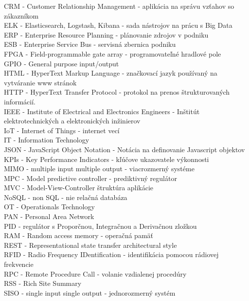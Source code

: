 CRM - Customer Relationship Management - aplikácia na správu vzťahov so zákazníkom \\
ELK - Elasticsearch, Logstash, Kibana - sada nástrojov na prácu s Big Data \\
ERP - Enterprise Resource Planning - plánovanie zdrojov v podniku \\
ESB - Enterprise Service Bus - servisná zbernica podniku \\
FPGA - Field-programmable gate array - programovateľné hradlové pole \\
GPIO - General purpose input/output \\
HTML - HyperText Markup Language - značkovací jazyk používaný na vytváranie www stránok \\
HTTP - HyperText Transfer Protocol - protokol na prenos štrukturovaných informácií. \\
IEEE - Institute of Electrical and Electronics Engineers - Inštitút elektrotechnických a elektronických inžinierov \\
IoT - Internet of Things - internet vecí \\
IT - Information Technology \\
JSON - JavaScript Object Notation - Notácia na definovanie Javascript objektov \\
KPIs - Key Performance Indicators - kľúčove ukazovatele výkonnosti \\
MIMO - multiple input multiple output - viacrozmerný systéme \\
MPC - Model predictive controller - prediktivný regulátor \\
MVC - Model-View-Controller štruktúra aplikácie \\
NoSQL - non SQL - nie relačná databáza \\
OT - Operationals Technology \\
PAN - Personal Area Network \\
PID - regulátor s Proporčnou, Integračnou a Derivačnou zložkou \\
RAM - Random access memory - operačná pamäť \\
REST - Representational state transfer architectural style \\
RFID - Radio Frequency IDentification - identifikácia pomocou rádiovej frekvencie \\
RPC - Remote Procedure Call - volanie vzdialenej procedúry \\
RSS - Rich Site Summary \\
SISO - single input single output - jednorozmerný systém \\
